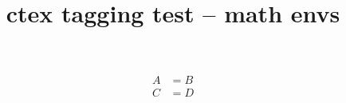 \documentclass{article}
\title{ctex tagging test -- math envs}
\begin{document}
\begin{align}
A &= B\\
C &= D
\end{align}
\end{document}

